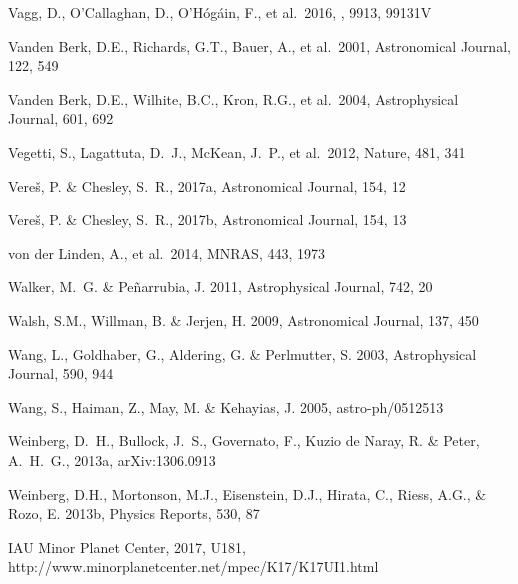 \documentclass[twocolumn]{aastex61}
\begin{document}
\begin{thebibliography}{}
 Vagg, D., O'Callaghan, D., O'H{\'o}g{\'a}in, F., et al.\ 2016, \procspie, 9913, 99131V

 Vanden Berk, D.E., Richards, G.T., Bauer, A., et al.~2001, Astronomical Journal, 122, 549

 Vanden Berk, D.E., Wilhite, B.C., Kron, R.G., et al.~2004, Astrophysical Journal, 601, 692

 Vegetti, S., Lagattuta, D.~J., McKean, J.~P., et al.\ 2012, Nature, 481, 341

 Vere{\v s}, P. \& Chesley, S.~R., 2017a, Astronomical Journal, 154, 12

 Vere{\v s}, P. \& Chesley, S.~R., 2017b, Astronomical Journal, 154, 13

 von der Linden, A., et al.~2014, MNRAS, 443, 1973

 Walker, M.~G. \& Pe{\~n}arrubia, J. 2011, Astrophysical Journal, 742, 20


 Walsh, S.M., Willman, B. \& Jerjen, H. 2009, Astronomical Journal, 137, 450

 Wang, L., Goldhaber, G., Aldering, G. \& Perlmutter, S. 2003, Astrophysical Journal, 590, 944

 Wang, S., Haiman, Z., May, M. \& Kehayias, J. 2005, astro-ph/0512513

 Weinberg, D.~H., Bullock, J.~S., Governato, F., Kuzio de Naray, R. \& Peter, A.~H.~G., 2013a, arXiv:1306.0913

 Weinberg, D.H., Mortonson, M.J., Eisenstein, D.J., Hirata, C., Riess, A.G., \& Rozo, E. 2013b, Physics Reports, 530, 87

 IAU Minor Planet Center, 2017, U181, http://www.minorplanetcenter.net/mpec/K17/K17UI1.html


\end{thebibliography}
\end{document}
